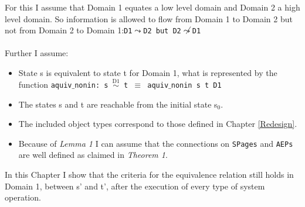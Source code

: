 \documentclass[11pt,a4paper, twoside, openright]{scrreprt}
\begin{document}
For this I assume that Domain 1 equates a low level domain and Domain 2 a high level domain. So  information is allowed to flow from Domain 1 to Domain 2 but not from Domain 2 to Domain 1:\texttt{D1$\leadsto$D2 but D2$\not\leadsto$D1} \\ \\
Further I assume:
\begin{itemize}
\item State s is equivalent to state t for Domain 1, what is represented by the function \texttt{aquiv$\_$nonin: s $\overset{\text{D1}}{\sim}$ t $\equiv$ aquiv$\_$nonin s t D1}	
\item The states s and t are reachable from the initial state s$_0$.
\item The included object types correspond to those defined in Chapter \ref{Redesign}.
\item Because of \textit{Lemma 1} I can assume that the connections on \texttt{SPages} and \texttt{AEPs} are well defined as claimed in \textit{Theorem 1}.
\end{itemize} 
In this Chapter I show that the criteria for the equivalence relation still holds in Domain 1, between s' and t', after the execution of every type of system operation. 

\clearpage

\clearpage
 
\clearpage

\clearpage

\clearpage

\clearpage

\clearpage
\end{document}
